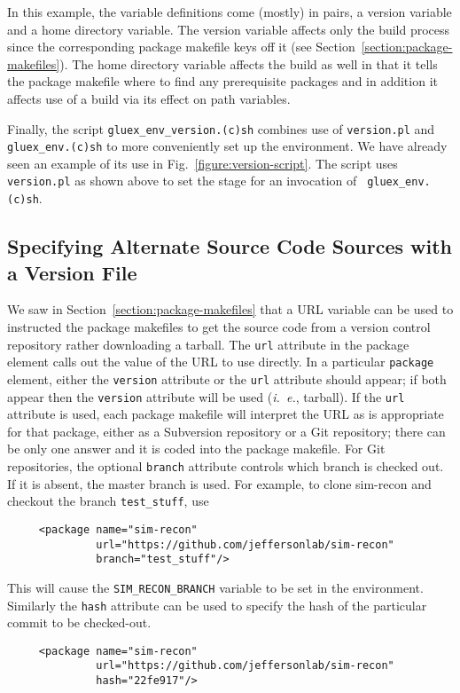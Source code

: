 \documentclass[12pt]{article}
\begin{document}
In this example, the variable definitions come (mostly) in pairs, a
version variable and a home directory variable. The version variable
affects only the build process since the corresponding package
makefile keys off it (see
Section~\ref{section:package-makefiles}). The home directory variable
affects the build as well in that it tells the package makefile where
to find any prerequisite packages and in addition it affects use of a
build via its effect on path variables.

Finally, the script {\tt gluex\_env\_version.(c)sh} combines use of
{\tt version.pl} and {\tt gluex\_env.(c)sh} to more conveniently set
up the environment. We have already seen an example of its use in
Fig.~\ref{figure:version-script}. The script uses {\tt version.pl} as
shown above to set the stage for an invocation of {\tt
  gluex\_env.(c)sh}.

\subsection{Specifying Alternate Source Code Sources with a Version File}

We saw in Section~\ref{section:package-makefiles} that a URL variable
can be used to instructed the package makefiles to get the source code
from a version control repository rather downloading a tarball. The
{\tt url} attribute in the package element calls out the value of the
URL to use directly. In a particular {\tt package} element, either the
{\tt version} attribute or the {\tt url} attribute should
appear; if both appear then the {\tt version} attribute will
be used ({\it i.~e.}, tarball).
If the {\tt url} attribute is used, each package makefile
will interpret the URL as is appropriate for that package, either as a
Subversion repository or a Git repository; there can be only one
answer and it is coded into the package makefile. For Git
repositories, the optional {\tt branch} attribute controls which
branch is checked out. If it is absent, the master branch is
used. For example, to clone sim-recon and checkout the branch
{\tt test\_stuff}, use
\begin{verbatim}
     <package name="sim-recon"
              url="https://github.com/jeffersonlab/sim-recon"
              branch="test_stuff"/>
\end{verbatim}
This will cause the {\tt SIM\_RECON\_BRANCH} variable to be set in
the environment. Similarly the {\tt hash} attribute can be used to
specify the hash of the particular commit to be checked-out.
\begin{verbatim}
     <package name="sim-recon"
              url="https://github.com/jeffersonlab/sim-recon"
              hash="22fe917"/>
\end{verbatim}
\end{document}
